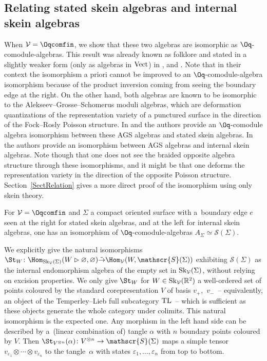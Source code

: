 \subsection*{Relating stated skein algebras and internal skein algebras} When $\mathcal{V} = \Oqcomfin$, we show that these two algebras are isomorphic as $\Oq$-comodule-algebras. This result was already known as folklore and stated in a slightly weaker form (only as algebras in $\rm Vect$) in \cite[Theorem~4.4]{LeYu}, \cite[Theorem~9.1]{LeSikora} and \cite[Remark 2.21]{Gunningham}. Note that in their context the isomorphism a priori cannot be improved to an $\Oq$-comodule-algebra isomorphism because of the product inversion coming from seeing the boundary edge at the right. On the other hand, both algebras are known to be isomorphic to the Alekseev--Grosse--Schomerus moduli algebras, which are deformation quantizations of the representation variety of a punctured surface in the direction of the Fock--Rosly Poisson structure. In \cite[Theorem~5.3]{Faitg} and \cite{Korinman} the authors provide an $\Oq$-comodule algebra isomorphism between these AGS algebras and stated skein algebras. In \cite[Section~7]{BBJ} the authors provide an isomorphism between AGS algebras and internal skein algebras. Note though that one does not see the braided opposite algebra structure through these isomorphisms, and it might be that one deforms the representation variety in the direction of the opposite Poisson structure. Section~\ref{SectRelation} gives a more direct proof of the isomorphism using only skein theory.
\begin{Theorem}
For $\mathcal{V} = \Oqcomfin$ and $\Sigma$ a compact oriented surface with a~boundary edge $e$ seen at the right for stated skein algebras, and at the left for internal skein algebras, one has an isomorphism of $\Oq$-comodule-algebras $A_\Sigma \simeq \mathscr{S}(\Sigma)$.
\end{Theorem}
We explicitly give the natural isomorphisms $\St_W\colon\Hom_{{\rm Sk}_\mathcal{V}(\Sigma)}(W\rhd\varnothing,\varnothing) \tilde{\to} \Hom_{\mathcal{V}}(W,\mathscr{S}(\Sigma))$ exhi\-bi\-ting $\mathscr{S}(\Sigma)$ as the internal endomorphism algebra of the empty set in ${\rm Sk}_\mathcal{V}(\Sigma)$, without relying on excision properties. We only give $\St_W$ for $W\in {\rm Sk}_\mathcal{V}(\mathbb{R}^2)$ a well-ordered set of points coloured by the standard corepresentation $V$ of basis $v_+$,~$v_-$~-- equivalently, an object of the Temperley--Lieb full subcategory ${\rm TL}$~-- which is sufficient as these objects generate the whole category under colimits. This natural isomorphism is the expected one. Any morphism in the left hand side can be described by a~(linear combination of) tangle $\alpha$ with $n$ boundary points coloured by $V$. Then $\St_{V^{\otimes n}}(\alpha)\colon V^{\otimes n} \to \mathscr{S}(\Sigma)$ maps a simple tensor $v_{\varepsilon_1}\otimes\cdots \otimes v_{\varepsilon_n}$ to the tangle~$\alpha$ with states $\varepsilon_1,\dots,\varepsilon_n$ from top to bottom.
